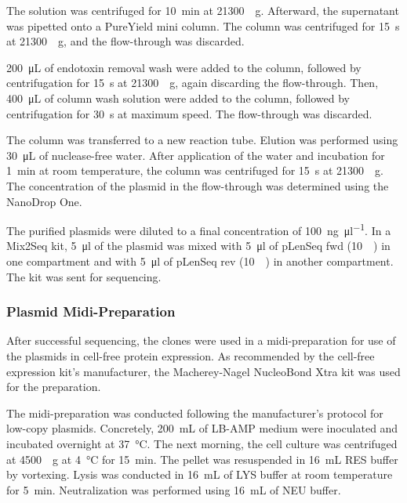 The solution was centrifuged for \SI{10}{\minute} at \SI{21300}{\times g}. Afterward, the supernatant was pipetted onto a PureYield\textsuperscript{\texttrademark} mini column. The column was centrifuged for \SI{15}{\second} at \SI{21300}{\times g}, and the flow-through was discarded.

\SI{200}{\micro\liter} of endotoxin removal wash were added to the column, followed by centrifugation for \SI{15}{\second} at \SI{21300}{\times g}, again discarding the flow-through. Then, \SI{400}{\micro\liter} of column wash solution were added to the column, followed by centrifugation for \SI{30}{\second} at maximum speed. The flow-through was discarded.

The column was transferred to a new reaction tube. Elution was performed using \SI{30}{\micro\liter} of nuclease-free water. After application of the water and incubation for \SI{1}{\minute} at room temperature, the column was centrifuged for \SI{15}{\second} at \SI{21300}{\times g}. The concentration of the plasmid in the flow-through was determined using the NanoDrop\textsuperscript{\texttrademark} One.

The purified plasmids were diluted to a final concentration of \SI{100}{\nano\gram\per\micro\litre}. In a Mix2Seq kit, \SI{5}{\micro\litre} of the plasmid was mixed with \SI{5}{\micro\litre} of pLenSeq fwd (\SI{10}{\micro\Molar}) in one compartment and with \SI{5}{\micro\litre} of pLenSeq rev (\SI{10}{\micro\Molar}) in another compartment. The kit was sent for sequencing.

\subsubsection{Plasmid Midi-Preparation}
After successful sequencing, the clones were used in a midi-preparation for use of the plasmids in cell-free protein expression. As recommended by the cell-free expression kit's manufacturer, the Macherey-Nagel\textsuperscript{\textregistered} NucleoBond\textsuperscript{\textregistered} Xtra kit was used for the preparation. 

The midi-preparation was conducted following the manufacturer's protocol for low-copy plasmids. Concretely, \SI{200}{\milli\liter} of LB-AMP medium were inoculated and incubated overnight at \SI{37}{\celsius}. The next morning, the cell culture was centrifuged at \SI{4500}{\times g} at \SI{4}{\celsius} for \SI{15}{\minute}. The pellet was resuspended in \SI{16}{\milli\liter} RES buffer by vortexing. Lysis was conducted in \SI{16}{\milli\liter} of LYS buffer at room temperature for \SI{5}{\minute}. Neutralization was performed using \SI{16}{\milli\liter} of NEU buffer. 

